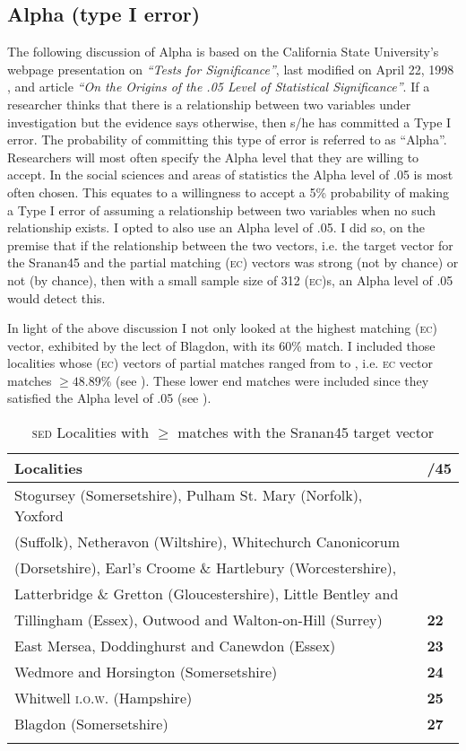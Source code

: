 \subsection{Alpha (type I error)}\label{4.2.1}
The following discussion of Alpha is based on the California State University's webpage presentation on \emph{``Tests for Significance''}, last modified on April 22, 1998 \citep{Stats}, and \citet{Cowles82} article \emph{``On the Origins of the .05 Level of Statistical Significance''}.
If a researcher thinks that there is a relationship between two variables under investigation but the evidence says otherwise, then s/he has committed a Type I error. The probability of committing this type of error is referred to as ``Alpha''. Researchers will most often specify the Alpha level that they are willing to accept. In the social sciences and areas of statistics the Alpha level of .05 is most often chosen. This equates to a willingness to accept a 5\% probability of making a Type I error of assuming a relationship between two variables when no such relationship exists. I opted to also use an Alpha level of .05. I did so, on the premise that if the relationship between the two vectors, i.e. the target vector for the Sranan45 and the partial matching (\textsc{ec}) vectors was strong (not by chance) or not (by chance), then with a small sample size of 312 (\textsc{ec})s, an Alpha level of .05 would detect this.

In light of the above discussion I not only looked at the highest matching (\textsc{ec}) vector, exhibited by the lect of Blagdon, with its 60\% match. I included those localities whose (\textsc{ec}) vectors of partial matches ranged from  to , i.e. \textsc{ec} vector matches $\geq 48.89\%$ (see ). These lower end matches were included since they satisfied the Alpha level of .05 (see ).

\begin{table}
\begin{tabular}{ll}
\lsptoprule 
 \textbf{Localities} & \textbf{/45}\\
\midrule 
Stogursey (Somersetshire), Pulham St. Mary (Norfolk), Yoxford \\ (Suffolk), Netheravon (Wiltshire), Whitechurch Canonicorum  \\ (Dorsetshire), Earl's Croome \& Hartlebury (Worcestershire),\\ Latterbridge \& Gretton (Gloucestershire), Little Bentley and \\ Tillingham (Essex), Outwood and Walton-on-Hill (Surrey) & \textbf{22}\\
East Mersea, Doddinghurst and Canewdon (Essex) &  \textbf{23} \\  
Wedmore and Horsington (Somersetshire) & \textbf{24}\\
Whitwell \textsc{i.o.w}. (Hampshire) &  \textbf{25}\\
Blagdon (Somersetshire) &  \textbf{27} \\
\lspbottomrule 
\end{tabular}
\caption{\textsc{sed} Localities with $\geq$  matches with the Sranan45 target vector}
\label{Table 4.3}
\end{table}

